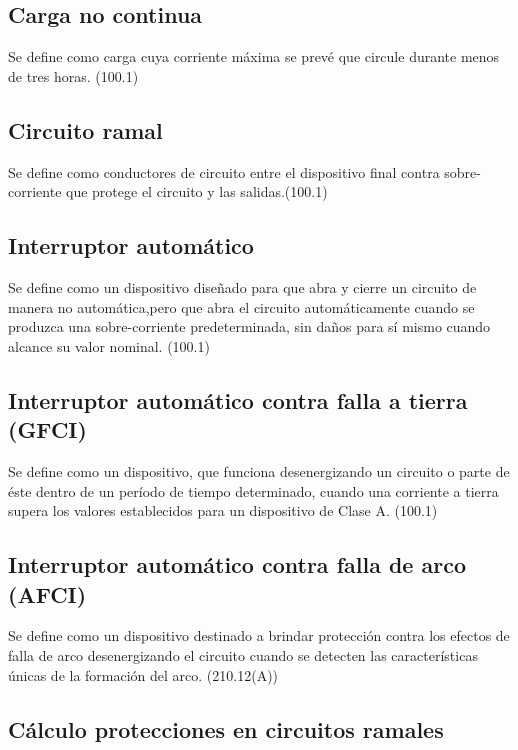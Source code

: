 \subsection{Carga no continua}

Se define como carga cuya corriente máxima se prevé que circule durante menos de tres horas. (100.1) \cite{NFPA70}


\subsection{Circuito ramal}

Se define como conductores de circuito entre el dispositivo final contra sobre-corriente que protege el
circuito y las salidas.(100.1) \cite{NFPA70}

\subsection{Interruptor automático}

Se define como un dispositivo diseñado para que abra y cierre un circuito de manera no automática,pero que abra el circuito automáticamente cuando se produzca una sobre-corriente predeterminada, sin daños para sí mismo cuando alcance su valor nominal. (100.1) \cite{NFPA70}


\subsection{Interruptor automático contra falla a tierra (GFCI)}

Se define como un dispositivo, que funciona desenergizando un circuito o parte de éste dentro de un período de tiempo determinado, cuando una corriente a tierra supera los valores establecidos para un dispositivo de Clase A. (100.1) \cite{NFPA70}


\subsection{Interruptor automático contra falla de arco (AFCI)}

Se define como un dispositivo destinado a brindar protección contra los efectos de falla de arco desenergizando el circuito cuando se detecten las características únicas de la formación del arco. (210.12(A))\cite{NFPA70}



\subsection{Cálculo protecciones en circuitos ramales}


